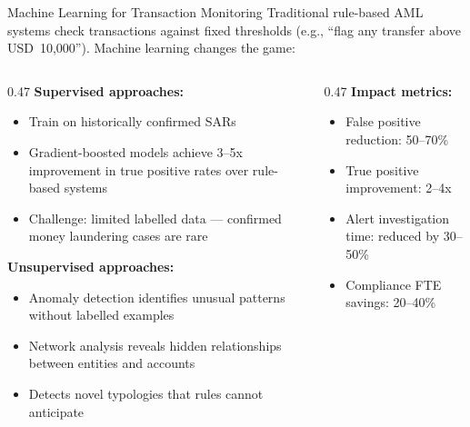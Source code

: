 \begin{frame}{Machine Learning for Transaction Monitoring}
  Traditional rule-based AML systems check transactions against fixed thresholds
  (e.g., ``flag any transfer above USD~10,000''). Machine learning changes the game:

  \vspace{0.5em}
  \begin{columns}[T]
    \begin{column}{0.47\textwidth}
      \textcolor{mlpurple}{\textbf{Supervised approaches:}}
      \begin{itemize}
        \item Train on historically confirmed SARs
        \item Gradient-boosted models achieve 3--5x improvement in
              true positive rates over rule-based systems
        \item Challenge: limited labelled data --- confirmed money
              laundering cases are rare
      \end{itemize}
      \vspace{0.3em}
      \textcolor{mlblue}{\textbf{Unsupervised approaches:}}
      \begin{itemize}
        \item Anomaly detection identifies unusual patterns without
              labelled examples
        \item Network analysis reveals hidden relationships between
              entities and accounts
        \item Detects novel typologies that rules cannot anticipate
      \end{itemize}
    \end{column}
    \begin{column}{0.47\textwidth}
      \textcolor{mlgreen}{\textbf{Impact metrics:}}
      \begin{itemize}
        \item False positive reduction: 50--70\%
        \item True positive improvement: 2--4x
        \item Alert investigation time: reduced by 30--50\%
        \item Compliance FTE savings: 20--40\%
      \end{itemize}
      \vspace{0.3em}

\end{column}
\end{columns}
\end{frame}
